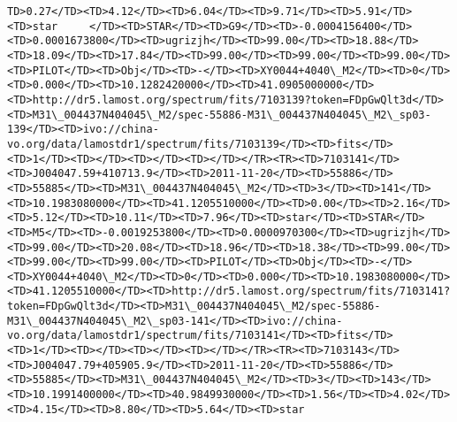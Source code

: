 \documentclass[11pt]{article}
\begin{document}
\begin{Verbatim}[commandchars=\\\{\}]
TD>0.27</TD><TD>4.12</TD><TD>6.04</TD><TD>9.71</TD><TD>5.91</TD><TD>star     </TD><TD>STAR</TD><TD>G9</TD><TD>-0.0004156400</TD><TD>0.0001673800</TD><TD>ugrizjh</TD><TD>99.00</TD><TD>18.88</TD><TD>18.09</TD><TD>17.84</TD><TD>99.00</TD><TD>99.00</TD><TD>99.00</TD><TD>PILOT</TD><TD>Obj</TD><TD>-</TD><TD>XY0044+4040\_M2</TD><TD>0</TD><TD>0.000</TD><TD>10.1282420000</TD><TD>41.0905000000</TD><TD>http://dr5.lamost.org/spectrum/fits/7103139?token=FDpGwQlt3d</TD><TD>M31\_004437N404045\_M2/spec-55886-M31\_004437N404045\_M2\_sp03-139</TD><TD>ivo://china-vo.org/data/lamostdr1/spectrum/fits/7103139</TD><TD>fits</TD><TD>1</TD><TD></TD><TD></TD><TD></TD></TR><TR><TD>7103141</TD><TD>J004047.59+410713.9</TD><TD>2011-11-20</TD><TD>55886</TD><TD>55885</TD><TD>M31\_004437N404045\_M2</TD><TD>3</TD><TD>141</TD><TD>10.1983080000</TD><TD>41.1205510000</TD><TD>0.00</TD><TD>2.16</TD><TD>5.12</TD><TD>10.11</TD><TD>7.96</TD><TD>star</TD><TD>STAR</TD><TD>M5</TD><TD>-0.0019253800</TD><TD>0.0000970300</TD><TD>ugrizjh</TD><TD>99.00</TD><TD>20.08</TD><TD>18.96</TD><TD>18.38</TD><TD>99.00</TD><TD>99.00</TD><TD>99.00</TD><TD>PILOT</TD><TD>Obj</TD><TD>-</TD><TD>XY0044+4040\_M2</TD><TD>0</TD><TD>0.000</TD><TD>10.1983080000</TD><TD>41.1205510000</TD><TD>http://dr5.lamost.org/spectrum/fits/7103141?token=FDpGwQlt3d</TD><TD>M31\_004437N404045\_M2/spec-55886-M31\_004437N404045\_M2\_sp03-141</TD><TD>ivo://china-vo.org/data/lamostdr1/spectrum/fits/7103141</TD><TD>fits</TD><TD>1</TD><TD></TD><TD></TD><TD></TD></TR><TR><TD>7103143</TD><TD>J004047.79+405905.9</TD><TD>2011-11-20</TD><TD>55886</TD><TD>55885</TD><TD>M31\_004437N404045\_M2</TD><TD>3</TD><TD>143</TD><TD>10.1991400000</TD><TD>40.9849930000</TD><TD>1.56</TD><TD>4.02</TD><TD>4.15</TD><TD>8.80</TD><TD>5.64</TD><TD>star     
\end{Verbatim}
\end{document}

